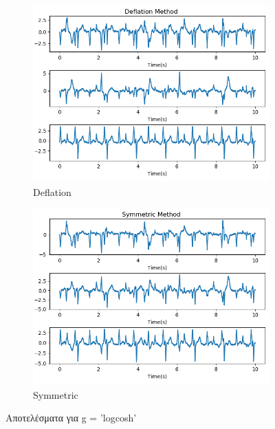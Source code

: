 \begin{figure}[H]
    \centering
    \begin{subfigure}{0.48 \textwidth}
        \centering
       \includegraphics[width=\textwidth]{biosignals/aami_logcosh_def.png} \en
        \caption{Deflation} \gr
        \label{fig:5.14a}
    \end{subfigure}
    \hfill
    \begin{subfigure}{0.48 \textwidth}
        \centering
       \includegraphics[width=\textwidth]{biosignals/aami_logcosh_sym.png} \en
        \en
        \caption{Symmetric} \gr
        \label{fig:5.14b}
    \end{subfigure}
    \gr
    \caption{Αποτελέσματα για \en g = 'logcosh' \gr}
\end{figure}
